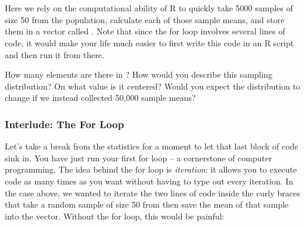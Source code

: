 \documentclass[11pt]{article}
\begin{document}
\ttfamily\noindent
\hlstd{}\hspace*{\fill}\\
\hlstd{}\hlassignement{\usebox{\hlnormalsizeboxlessthan}-}{\ }\hlkeyword{(}\hlkeyword{,}{\ }\hlkeyword{)}\hspace*{\fill}\\

\hlstd{}\hlkeyword{(}\hlkeyword{:}\hlkeyword{)}\hlkeyword{\usebox{\hlnormalsizeboxopenbrace}}\hspace*{\fill}\\
\hlstd{}{\ }{\ }{\ }\hlassignement{\usebox{\hlnormalsizeboxlessthan}-}{\ }\hlkeyword{(}\hlkeyword{,}{\ }\hlkeyword{)}\hspace*{\fill}\\
\hlstd{}{\ }{\ }{\ }\hlkeyword{[}\hlkeyword{]}{\ }\hlassignement{\usebox{\hlnormalsizeboxlessthan}-}{\ }\hlkeyword{(}\hlkeyword{)}\hspace*{\fill}\\
\hlstd{}{\ }{\ }{\ }\hlkeyword{\usebox{\hlnormalsizeboxclosebrace}}\hspace*{\fill}\\

\hlstd{}\hlkeyword{(}\hlkeyword{)}\hspace*{\fill}\\
\normalfont

Here we rely on the computational ability of R to quickly take 5000 samples of size 50 from the population, calculate each of those sample means, and store them in a vector called \texttt{}. Note that since the for loop involves several lines of code, it would make your life much easier to first write this code in an R script and then run it from there.

\begin{exercise}
How many elements are there in \texttt{}?  How would you describe this sampling distribution?  On what value is it centered?  Would you expect the distribution to change if we instead collected 50,000 sample means?
\end{exercise}

\subsubsection*{Interlude: The For Loop}
Let's take a break from the statistics for a moment to let that last block of code sink in.  You have just run your first for loop -- a cornerstone of computer programming.  The idea behind the for loop is \emph{iteration}: it allows you to execute code as many times as you want without having to type out every iteration.  In the case above, we wanted to iterate the two lines of code inside the curly braces that take a random sample of size 50 from \texttt{} then save the mean of that sample into the \texttt{} vector.  Without the for loop, this would be painful:
\end{document}
